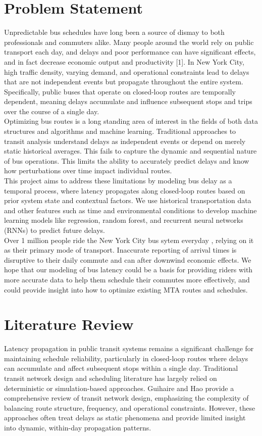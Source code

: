 \documentclass[sigconf]{acmart}
\begin{document}
\section{Problem Statement}
Unpredictable bus schedules have long been a source of dismay to both professionals and commuters alike. Many people around the world rely on public transport each day, and delays and poor performance can have significant effects, and in fact decrease economic output and productivity [1]. In New York City, high traffic density, varying demand, and operational constraints lead to delays that are not independent events but propagate throughout the entire system. Specifically, public buses that operate on closed-loop routes are temporally dependent, meaning delays accumulate and influence subsequent stops and trips over the course of a single day.\\
Optimizing bus routes is a long standing area of interest in the fields of both data structures and algorithms and machine learning. Traditional approaches to transit analysis understand delays as independent events or depend on merely static historical averages. This fails to capture the dynamic and sequential nature of bus operations. This limits the ability to accurately predict delays and know how perturbations over time impact individual routes.\\
This project aims to address these limitations by modeling bus delay as a temporal process, where latency propagates along closed-loop routes based on prior system state and contextual factors. We use historical transportation data and other features such as time and environmental conditions to develop machine learning models like regression, random forest, and recurrent neural networks (RNNs) to predict future delays.\\
Over 1 million people ride the New York City bus sytem everyday \cite{MTA}, relying on it as their primary mode of transport. Inaccurate reporting of arrival times is disruptive to their daily commute and can after downwind economic effects. We hope that our modeling of bus latency could be a basis for providing riders with more accurate data to help them schedule their commutes more effectively, and could provide insight into how to optimize existing MTA routes and schedules.
\section{Literature Review}

Latency propagation in public transit systems remains a significant challenge for maintaining schedule reliability, particularly in closed-loop routes where delays can accumulate and affect subsequent stops within a single day. Traditional transit network design and scheduling literature has largely relied on deterministic or simulation-based approaches. Guihaire and Hao \cite{guihaire2008} provide a comprehensive review of transit network design, emphasizing the complexity of balancing route structure, frequency, and operational constraints. However, these approaches often treat delays as static phenomena and provide limited insight into dynamic, within-day propagation patterns.
\end{document}
